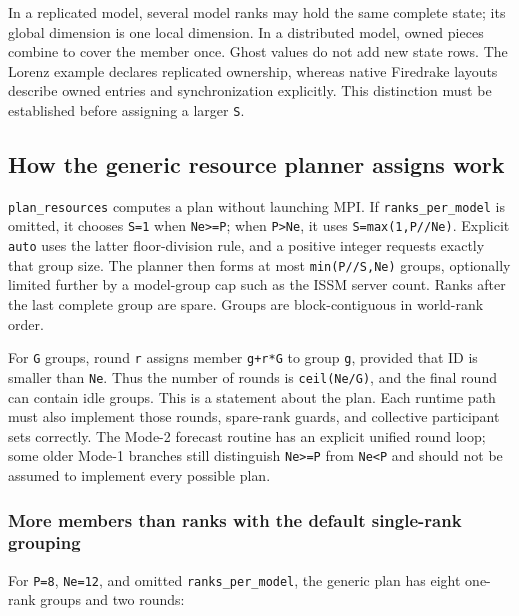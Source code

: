 \documentclass[11pt,a4paper]{article}
\newcommand{\code}[1]{\nolinkurl{#1}}
\begin{document}
In a replicated model, several model ranks may hold the same complete state; its global dimension is one local dimension. In a distributed model, owned pieces combine to cover the member once. Ghost values do not add new state rows. The Lorenz example declares replicated ownership, whereas native Firedrake layouts describe owned entries and synchronization explicitly. This distinction must be established before assigning a larger \code{S}.

\subsection{How the generic resource planner assigns work}

\code{plan_resources} computes a plan without launching MPI. If \code{ranks_per_model} is omitted, it chooses \code{S=1} when \code{Ne>=P}; when \code{P>Ne}, it uses \code{S=max(1,P//Ne)}. Explicit \code{auto} uses the latter floor-division rule, and a positive integer requests exactly that group size. The planner then forms at most \code{min(P//S,Ne)} groups, optionally limited further by a model-group cap such as the ISSM server count. Ranks after the last complete group are spare. Groups are block-contiguous in world-rank order.

For \code{G} groups, round \code{r} assigns member \code{g+r*G} to group \code{g}, provided that ID is smaller than \code{Ne}. Thus the number of rounds is \code{ceil(Ne/G)}, and the final round can contain idle groups. This is a statement about the plan. Each runtime path must also implement those rounds, spare-rank guards, and collective participant sets correctly. The Mode-2 forecast routine has an explicit unified round loop; some older Mode-1 branches still distinguish \code{Ne>=P} from \code{Ne<P} and should not be assumed to implement every possible plan.

\subsubsection{More members than ranks with the default single-rank grouping}

For \code{P=8}, \code{Ne=12}, and omitted \code{ranks_per_model}, the generic plan has eight one-rank groups and two rounds:
\end{document}
